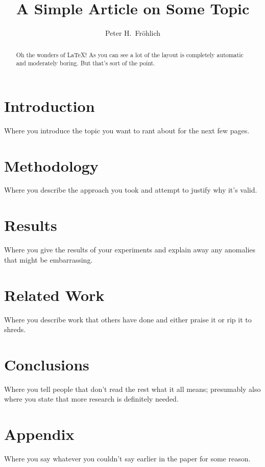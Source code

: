 \documentclass{article}
\title{A Simple Article on Some Topic}
\author{Peter H.\ Fr{\"o}hlich}
\begin{document}
\maketitle

\begin{abstract}
Oh the wonders of \LaTeX!
As you can see a lot of the layout is completely
automatic and moderately boring.
But that's sort of the point.
\end{abstract}

\section{Introduction}

Where you introduce the topic you want to rant
about for the next few pages.

\section{Methodology}

Where you describe the approach you took and
attempt to justify why it's valid.

\section{Results}

Where you give the results of your experiments
and explain away any anomalies that might be
embarrassing.

\section{Related Work}

Where you describe work that others have done
and either praise it or rip it to shreds.

\section{Conclusions}

Where you tell people that don't read the rest
what it all means; presumably also where you
state that more research is definitely needed.

\appendix

\section{Appendix}

Where you say whatever you couldn't say earlier
in the paper for some reason.
\end{document}
